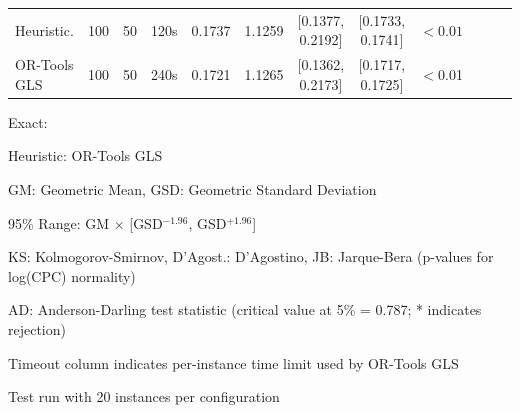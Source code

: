 \documentclass[a4paper,twoside]{article}
\begin{document}
\begin{table}[htbp]
\begin{tabular}{@{}l c c c S[table-format=1.4] S[table-format=1.4] c c c c c c@{}}
Heuristic.   & 100 & 50 & 120s & 0.1737 & 1.1259 & [0.1377, 0.2192] & [0.1733, 0.1741]& $<0.01$  \\
OR-Tools GLS & 100 & 50 & 240s & 0.1721 & 1.1265 & [0.1362, 0.2173] & [0.1717, 0.1725] & $<$0.01 \\
\bottomrule
\end{tabular}
\begin{tablenotes}
\small
\item Exact: 
\item Heuristic: OR-Tools GLS
\item GM: Geometric Mean, GSD: Geometric Standard Deviation
\item 95\% Range: GM $\times$ [GSD$^{-1.96}$, GSD$^{+1.96}$]
\item KS: Kolmogorov-Smirnov, D'Agost.: D'Agostino, JB: Jarque-Bera (p-values for log(CPC) normality)
\item AD: Anderson-Darling test statistic (critical value at 5\% = 0.787; * indicates rejection)
\item Timeout column indicates per-instance time limit used by OR-Tools GLS
\item Test run with 20 instances per configuration
\end{tablenotes}
\end{table}
\end{document}
